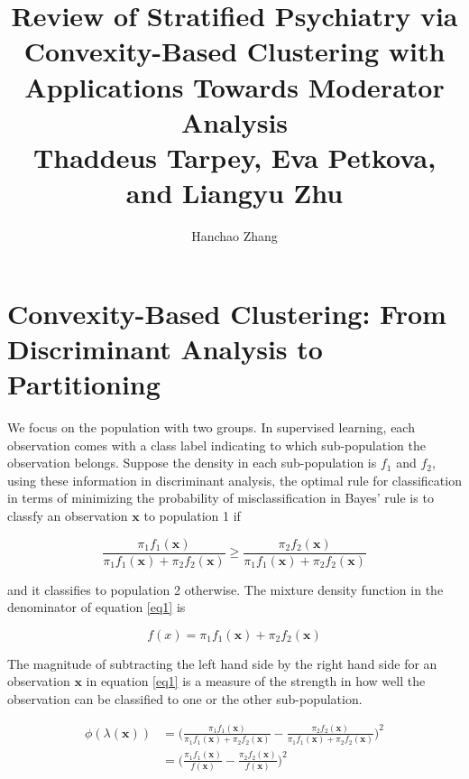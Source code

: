 \documentclass{article}
\begin{document}
\title{Review of Stratified Psychiatry via Convexity-Based Clustering with Applications Towards Moderator Analysis \\ \vspace{0.5cm} \small{Thaddeus Tarpey, Eva Petkova, and Liangyu Zhu}}

\author{Hanchao Zhang}

\maketitle
\vspace{-10mm}
\section{Convexity-Based Clustering: From Discriminant Analysis to Partitioning}

We focus on the population with two groups. In supervised learning, each observation comes with a class label indicating to which sub-population the observation belongs. Suppose the density in each sub-population is $f_1$ and $f_2$, using these information in discriminant analysis, the optimal rule for classification in terms of minimizing the probability of misclassification in Bayes' rule is to classfy an observation $\pmb x$ to population 1 if 

\begin{equation}\label{eq1}
	\frac{\pi_1f_1(\pmb x)}{\pi_1f_1(\pmb x) + \pi_2f_2(\pmb x)} \ge \frac{\pi_2f_2(\pmb x)}{\pi_1f_1(\pmb x) + \pi_2f_2(\pmb x)}
\end{equation}

and it classifies to population 2 otherwise. The mixture density function in the denominator of equation \ref{eq1} is

\begin{equation}
	f(x) = \pi_1f_1(\pmb x) + \pi_2f_2(\pmb x)
\end{equation}

The magnitude of subtracting the left hand side by the right hand side for an observation $\pmb x$ in equation \ref{eq1} is a measure of the strength in how well the observation can be classified to one or the other sub-population.

\begin{align}
	\phi(\lambda(\pmb x)) & = \Bigg( \frac{\pi_1f_1(\pmb x)}{\pi_1f_1(\pmb x) + \pi_2f_2(\pmb x)} -  \frac{\pi_2f_2(\pmb x)}{\pi_1f_1(\pmb x) + \pi_2f_2(\pmb x)} \Bigg)^2\\
	& = \Bigg(\frac{\pi_1f_1(\pmb x)}{f(\pmb x)} - \frac{\pi_2f_2(\pmb x)}{f(\pmb x)}  \Bigg)^2
\end{align}
\end{document}
